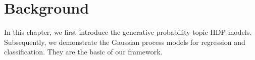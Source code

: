 \chapter{Background}
\label{chap:bg}
In this chapter, we first introduce the generative probability topic HDP models. Subsequently, we demonstrate the Gaussian process models for regression and classification.
They are the basic of our framework.
